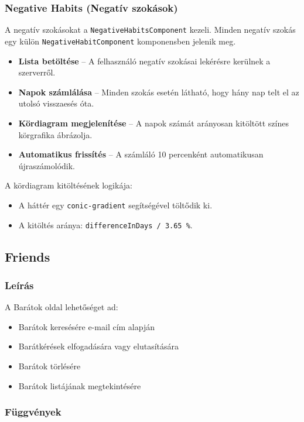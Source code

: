 \documentclass[12pt]{report}
\begin{document}
\subsubsection{Negative Habits (Negatív szokások)}

A negatív szokásokat a \texttt{NegativeHabitsComponent} kezeli. Minden negatív szokás egy külön \texttt{NegativeHabitComponent} komponensben jelenik meg.

\begin{itemize}
  \item \textbf{Lista betöltése} -- A felhasználó negatív szokásai lekérésre kerülnek a szerverről.
  \item \textbf{Napok számlálása} -- Minden szokás esetén látható, hogy hány nap telt el az utolsó visszaesés óta.
  \item \textbf{Kördiagram megjelenítése} -- A napok számát arányosan kitöltött színes körgrafika ábrázolja.
  \item \textbf{Automatikus frissítés} -- A számláló 10 percenként automatikusan újraszámolódik.
\end{itemize}

A kördiagram kitöltésének logikája:
\begin{itemize}
  \item A háttér egy \texttt{conic-gradient} segítségével töltődik ki.
  \item A kitöltés aránya: \texttt{differenceInDays / 3.65 \%}.
\end{itemize}

 \subsection{Friends}

\subsubsection{Leírás}
A Barátok oldal lehetőséget ad:
\begin{itemize}
  \item Barátok keresésére e-mail cím alapján
  \item Barátkérések elfogadására vagy elutasítására
  \item Barátok törlésére
  \item Barátok listájának megtekintésére
\end{itemize}

\subsubsection{Függvények}
\end{document}

